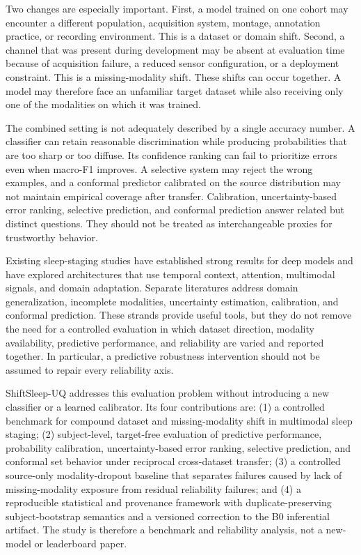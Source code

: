\documentclass[11pt]{article}
\begin{document}
Two changes are especially important. First, a model trained on one cohort may encounter a different population, acquisition system, montage, annotation practice, or recording environment. This is a dataset or domain shift. Second, a channel that was present during development may be absent at evaluation time because of acquisition failure, a reduced sensor configuration, or a deployment constraint. This is a missing-modality shift. These shifts can occur together. A model may therefore face an unfamiliar target dataset while also receiving only one of the modalities on which it was trained.

The combined setting is not adequately described by a single accuracy number. A classifier can retain reasonable discrimination while producing probabilities that are too sharp or too diffuse. Its confidence ranking can fail to prioritize errors even when macro-F1 improves. A selective system may reject the wrong examples, and a conformal predictor calibrated on the source distribution may not maintain empirical coverage after transfer. Calibration, uncertainty-based error ranking, selective prediction, and conformal prediction answer related but distinct questions. They should not be treated as interchangeable proxies for trustworthy behavior.

Existing sleep-staging studies have established strong results for deep models and have explored architectures that use temporal context, attention, multimodal signals, and domain adaptation. Separate literatures address domain generalization, incomplete modalities, uncertainty estimation, calibration, and conformal prediction. These strands provide useful tools, but they do not remove the need for a controlled evaluation in which dataset direction, modality availability, predictive performance, and reliability are varied and reported together. In particular, a predictive robustness intervention should not be assumed to repair every reliability axis.

ShiftSleep-UQ addresses this evaluation problem without introducing a new classifier or a learned calibrator. Its four contributions are: (1) a controlled benchmark for compound dataset and missing-modality shift in multimodal sleep staging; (2) subject-level, target-free evaluation of predictive performance, probability calibration, uncertainty-based error ranking, selective prediction, and conformal set behavior under reciprocal cross-dataset transfer; (3) a controlled source-only modality-dropout baseline that separates failures caused by lack of missing-modality exposure from residual reliability failures; and (4) a reproducible statistical and provenance framework with duplicate-preserving subject-bootstrap semantics and a versioned correction to the B0 inferential artifact. The study is therefore a benchmark and reliability analysis, not a new-model or leaderboard paper.
\end{document}
